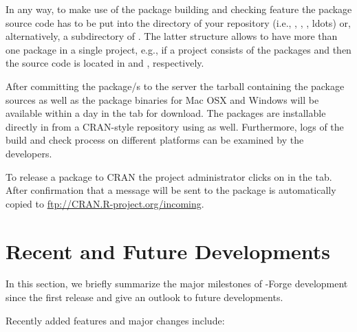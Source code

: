 In any way, to make use of the package building and checking feature
the package source code has to be put into the  directory
of your repository (i.e., ,
, , ldots{}) or, alternatively, a 
subdirectory of . The latter structure allows to
have more than one package in a single project, e.g., if
a project consists of the packages  and  then the
source code is located in  and ,
respectively.

After committing the package/s to the server the tarball containing
the package sources as well as the package binaries for Mac OSX and
Windows will be available
within a day in the  tab for download. The packages
are installable directly in \R{} from a CRAN-style repository using
as well. Furthermore, logs of the build and check process on different
platforms can be examined by the developers.  

To release a package to CRAN the project administrator clicks on
 in the  tab. After
confirmation that a message will be sent to 
the package is automatically copied to
\url{ftp://CRAN.R-project.org/incoming}.

\section*{Recent and Future Developments}

In this section, we briefly summarize the major milestones of
\R{}-Forge development since the first release and give an outlook to
future developments.

Recently added features and major changes include:

